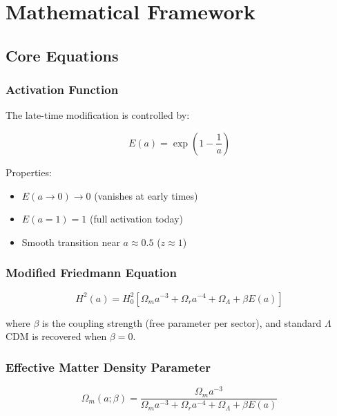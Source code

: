 \documentclass[11pt,letterpaper]{article}
\begin{document}
\section{Mathematical Framework}

\subsection{Core Equations}

\subsubsection{Activation Function}

The late-time modification is controlled by:

\begin{equation}
E(a) = \exp\left(1 - \frac{1}{a}\right)
\end{equation}

\noindent Properties:
\begin{itemize}
\item $E(a \to 0) \to 0$ (vanishes at early times)
\item $E(a = 1) = 1$ (full activation today)
\item Smooth transition near $a \approx 0.5$ ($z \approx 1$)
\end{itemize}

\subsubsection{Modified Friedmann Equation}

\begin{equation}
H^2(a) = H_0^2\left[\Omega_m a^{-3} + \Omega_r a^{-4} + \Omega_\Lambda + \beta E(a)\right]
\end{equation}

where $\beta$ is the coupling strength (free parameter per sector), and standard $\Lambda$CDM is recovered when $\beta = 0$.

\subsubsection{Effective Matter Density Parameter}

\begin{equation}
\Omega_m(a; \beta) = \frac{\Omega_m a^{-3}}{\Omega_m a^{-3} + \Omega_r a^{-4} + \Omega_\Lambda + \beta E(a)}
\end{equation}
\end{document}

